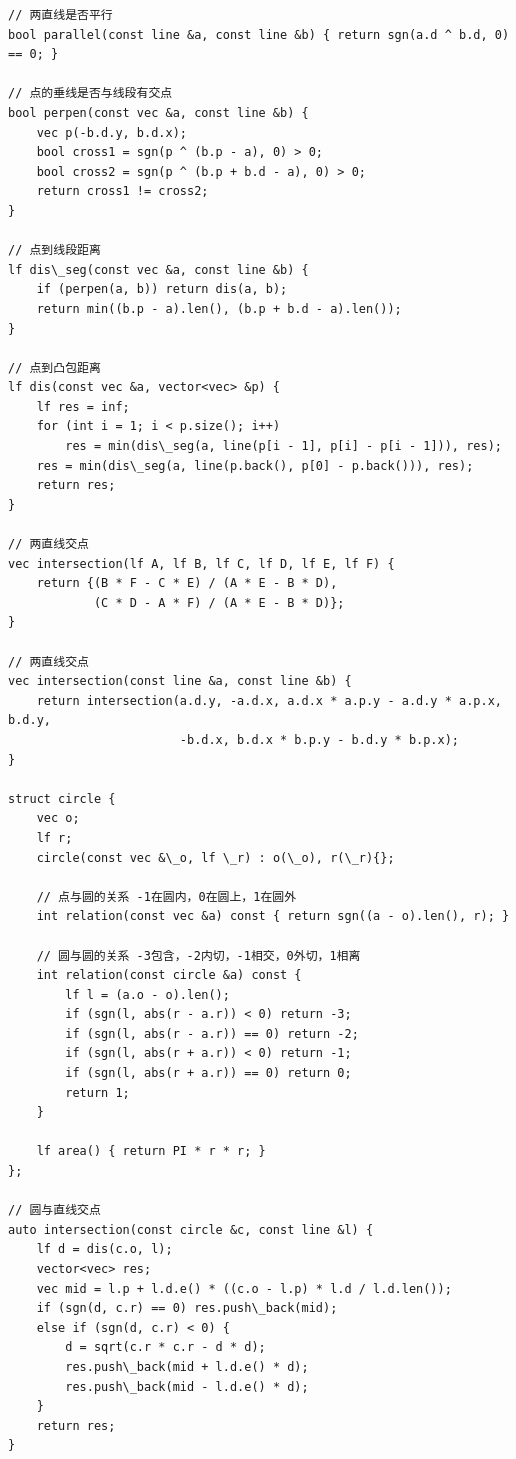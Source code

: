 \documentclass[UTF8]{ctexart}
\begin{document}
\begin{sloppypar}
\begin{lstlisting}[style=cpp]
// 两直线是否平行
bool parallel(const line &a, const line &b) { return sgn(a.d ^ b.d, 0) == 0; }

// 点的垂线是否与线段有交点
bool perpen(const vec &a, const line &b) {
    vec p(-b.d.y, b.d.x);
    bool cross1 = sgn(p ^ (b.p - a), 0) > 0;
    bool cross2 = sgn(p ^ (b.p + b.d - a), 0) > 0;
    return cross1 != cross2;
}

// 点到线段距离
lf dis\_seg(const vec &a, const line &b) {
    if (perpen(a, b)) return dis(a, b);
    return min((b.p - a).len(), (b.p + b.d - a).len());
}

// 点到凸包距离
lf dis(const vec &a, vector<vec> &p) {
    lf res = inf;
    for (int i = 1; i < p.size(); i++)
        res = min(dis\_seg(a, line(p[i - 1], p[i] - p[i - 1])), res);
    res = min(dis\_seg(a, line(p.back(), p[0] - p.back())), res);
    return res;
}

// 两直线交点
vec intersection(lf A, lf B, lf C, lf D, lf E, lf F) {
    return {(B * F - C * E) / (A * E - B * D),
            (C * D - A * F) / (A * E - B * D)};
}

// 两直线交点
vec intersection(const line &a, const line &b) {
    return intersection(a.d.y, -a.d.x, a.d.x * a.p.y - a.d.y * a.p.x, b.d.y,
                        -b.d.x, b.d.x * b.p.y - b.d.y * b.p.x);
}

struct circle {
    vec o;
    lf r;
    circle(const vec &\_o, lf \_r) : o(\_o), r(\_r){};

    // 点与圆的关系 -1在圆内，0在圆上，1在圆外
    int relation(const vec &a) const { return sgn((a - o).len(), r); }

    // 圆与圆的关系 -3包含，-2内切，-1相交，0外切，1相离
    int relation(const circle &a) const {
        lf l = (a.o - o).len();
        if (sgn(l, abs(r - a.r)) < 0) return -3;
        if (sgn(l, abs(r - a.r)) == 0) return -2;
        if (sgn(l, abs(r + a.r)) < 0) return -1;
        if (sgn(l, abs(r + a.r)) == 0) return 0;
        return 1;
    }

    lf area() { return PI * r * r; }
};

// 圆与直线交点
auto intersection(const circle &c, const line &l) {
    lf d = dis(c.o, l);
    vector<vec> res;
    vec mid = l.p + l.d.e() * ((c.o - l.p) * l.d / l.d.len());
    if (sgn(d, c.r) == 0) res.push\_back(mid);
    else if (sgn(d, c.r) < 0) {
        d = sqrt(c.r * c.r - d * d);
        res.push\_back(mid + l.d.e() * d);
        res.push\_back(mid - l.d.e() * d);
    }
    return res;
}


\end{lstlisting}
\end{sloppypar}
\end{document}
